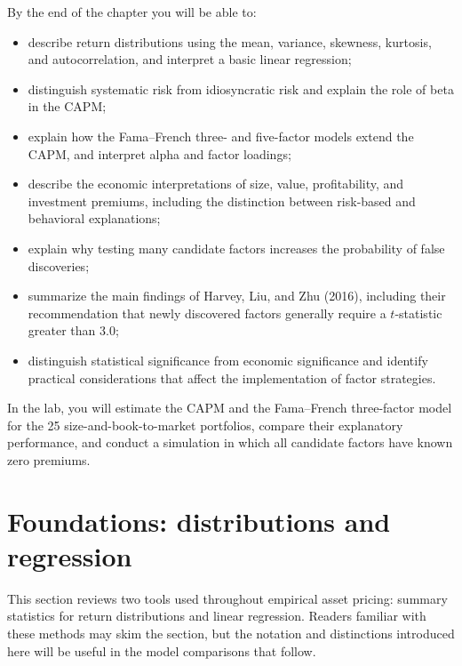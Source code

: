 By the end of the chapter you will be able to:
\begin{itemize}
  \item describe return distributions using the mean, variance, skewness, kurtosis, and autocorrelation, and interpret a basic linear regression;
  \item distinguish systematic risk from idiosyncratic risk and explain the role of beta in the CAPM;
  \item explain how the Fama--French three- and five-factor models extend the CAPM, and interpret alpha and factor loadings;
  \item describe the economic interpretations of size, value, profitability, and investment premiums, including the distinction between risk-based and behavioral explanations;
  \item explain why testing many candidate factors increases the probability of false discoveries;
  \item summarize the main findings of Harvey, Liu, and Zhu (2016), including their recommendation that newly discovered factors generally require a $t$-statistic greater than 3.0;
  \item distinguish statistical significance from economic significance and identify practical considerations that affect the implementation of factor strategies.
\end{itemize}

In the lab, you will estimate the CAPM and the Fama--French three-factor model for the 25 size-and-book-to-market portfolios, compare their explanatory performance, and conduct a simulation in which all candidate factors have known zero premiums.

\section{Foundations: distributions and regression}
\label{sec:03-foundations}

This section reviews two tools used throughout empirical asset pricing: summary statistics for return distributions and linear regression. Readers familiar with these methods may skim the section, but the notation and distinctions introduced here will be useful in the model comparisons that follow.


